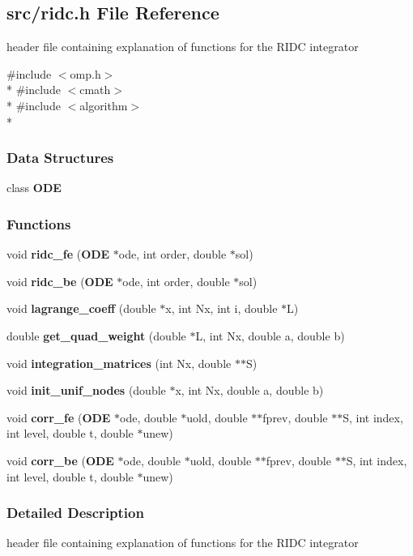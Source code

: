 \subsection{src/ridc.h File Reference}
\label{ridc_8h}


header file containing explanation of functions for the R\+I\+D\+C integrator  


{\ttfamily \#include $<$omp.\+h$>$}\\*
{\ttfamily \#include $<$cmath$>$}\\*
{\ttfamily \#include $<$algorithm$>$}\\*
\subsubsection*{Data Structures}
\begin{DoxyCompactItemize}
\item 
class {\bf O\+D\+E}
\end{DoxyCompactItemize}
\subsubsection*{Functions}
\begin{DoxyCompactItemize}
\item 
void {\bf ridc\+\_\+fe} ({\bf O\+D\+E} $\ast$ode, int order, double $\ast$sol)
\item 
void {\bf ridc\+\_\+be} ({\bf O\+D\+E} $\ast$ode, int order, double $\ast$sol)
\item 
void {\bf lagrange\+\_\+coeff} (double $\ast$x, int Nx, int i, double $\ast$L)
\item 
double {\bf get\+\_\+quad\+\_\+weight} (double $\ast$L, int Nx, double a, double b)
\item 
void {\bf integration\+\_\+matrices} (int Nx, double $\ast$$\ast$S)
\item 
void {\bf init\+\_\+unif\+\_\+nodes} (double $\ast$x, int Nx, double a, double b)
\item 
void {\bf corr\+\_\+fe} ({\bf O\+D\+E} $\ast$ode, double $\ast$uold, double $\ast$$\ast$fprev, double $\ast$$\ast$S, int index, int level, double t, double $\ast$unew)
\item 
void {\bf corr\+\_\+be} ({\bf O\+D\+E} $\ast$ode, double $\ast$uold, double $\ast$$\ast$fprev, double $\ast$$\ast$S, int index, int level, double t, double $\ast$unew)
\end{DoxyCompactItemize}


\subsubsection{Detailed Description}
header file containing explanation of functions for the R\+I\+D\+C integrator 

